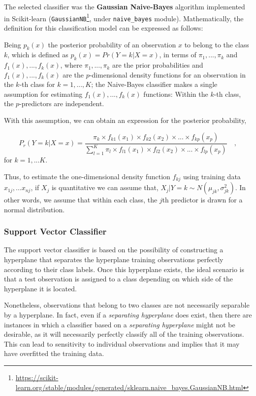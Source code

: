 \documentclass[a4paper, 12pt]{book}
\begin{document}
The selected classifier was the \textbf{Gaussian Naive-Bayes} algorithm implemented in Scikit-learn (\texttt{GaussianNB}\footnote{\url{https://scikit-learn.org/stable/modules/generated/sklearn.naive_bayes.GaussianNB.html}}, under \texttt{naive\_bayes} module). Mathematically, the definition for this classification model can be expressed as follows:

Being $p_{k}(x)$ the posterior probability of an observation $x$ to belong to the class $k$, which is defined as $p_{k}(x)= Pr(Y = k|X = x)$, in terms of $\pi_{1},...,\pi_{k}$ and $f_{1}(x),...,f_{k}(x)$, where $\pi_{1},...,\pi_{k}$ are the prior probabilities and $f_{1}(x),...,f_{k}(x)$ are the $p$-dimensional density functions for an observation in the $k$-th class for $k=1,...,K$; the Naive-Bayes classifier makes a single assumption for estimating $f_{1}(x),...,f_{k}(x)$ functions: Within the $k$-th class, the $p$-predictors are independent.

With this assumption, we can obtain an expression for the posterior probability,

\begin{center}
\begin{equation}
P_{r}(Y = k|X = x) = \frac{\pi_{k} \times f_{k1}(x_{1}) \times f_{k2}(x_{2}) \times ... \times f_{kp}(x_{p})}{\sum_{l=1}^{K} \pi_{l} \times f_{l1}(x_{1}) \times f_{l2}(x_{2}) \times ... \times f_{lp}(x_{p})} \quad,
\end{equation}
for $k = 1,...K$.
\end{center}

Thus, to estimate the one-dimensional density function $f_{kj}$ using training data $x_{1j},...x_{nj}$, if $X_{j}$ is quantitative we can assume that, $X_{j}|Y=k \sim N(\mu_{jk}, \sigma^2_{jk})$. In other words, we assume that within each class, the $j$th predictor is drawn for a normal distribution.

\subsubsection{Support Vector Classifier}
\label{sssec:linear-svms}

The support vector classifier is based on the possibility of constructing a
hyperplane that separates the hyperplane training observations perfectly
according to their class labels. Once this hyperplane exists, the ideal scenario
is that a test observation is assigned to a class depending on which side of
the hyperplane it is located.

Nonetheless, observations that belong to two classes are not
necessarily separable by a hyperplane. In fact, even if a \textit{separating hyperplane} does exist, then there are instances in which a classifier based on
a \textit{separating hyperplane} might not be desirable, as it will necessarily perfectly classify all of the training
observations. This can lead to sensitivity to individual observations and implies
that it may have overfitted the training data.
\end{document}
